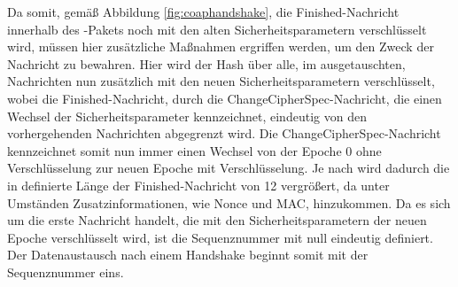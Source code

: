 Da somit, gemäß Abbildung \ref{fig:coaphandshake}, die Finished-Nachricht innerhalb des -Pakets noch mit den alten Sicherheitsparametern
verschlüsselt wird, müssen hier zusätzliche Maßnahmen ergriffen werden, um den Zweck der Nachricht zu bewahren. Hier wird der Hash über alle, im
 ausgetauschten, Nachrichten nun zusätzlich mit den neuen Sicherheitsparametern verschlüsselt, wobei die Finished-Nachricht, durch die
ChangeCipherSpec-Nachricht, die einen Wechsel der Sicherheitsparameter kennzeichnet, eindeutig von den vorhergehenden Nachrichten abgegrenzt wird.
Die ChangeCipherSpec-Nachricht kennzeichnet somit nun immer einen Wechsel von der Epoche 0 ohne Verschlüsselung zur neuen Epoche mit Verschlüsselung.
Je nach  wird dadurch die in  definierte Länge der Finished-Nachricht von 12 vergrößert, da unter Umständen Zusatzinformationen,
wie Nonce und MAC, hinzukommen. Da es sich um die erste Nachricht handelt, die mit den Sicherheitsparametern der neuen Epoche verschlüsselt wird, ist
die Sequenznummer mit null eindeutig definiert. Der Datenaustausch nach einem Handshake beginnt somit mit der Sequenznummer eins.